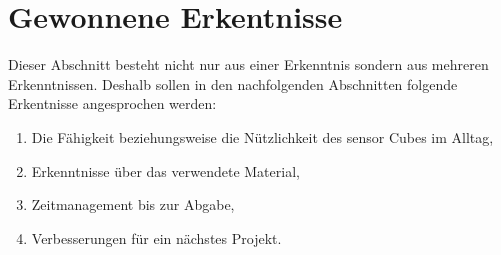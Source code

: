 \documentclass{article}
\begin{document}
\section{Gewonnene Erkentnisse}
Dieser Abschnitt besteht nicht nur aus einer Erkenntnis sondern aus mehreren Erkenntnissen. Deshalb sollen in den nachfolgenden Abschnitten folgende Erkentnisse angesprochen werden: 
\begin{enumerate}
\item Die Fähigkeit beziehungsweise die Nützlichkeit des sensor Cubes im Alltag,
\item Erkenntnisse über das verwendete Material,
\item Zeitmanagement bis zur Abgabe,
\item Verbesserungen für ein nächstes Projekt.
\end{enumerate}
\end{document}
